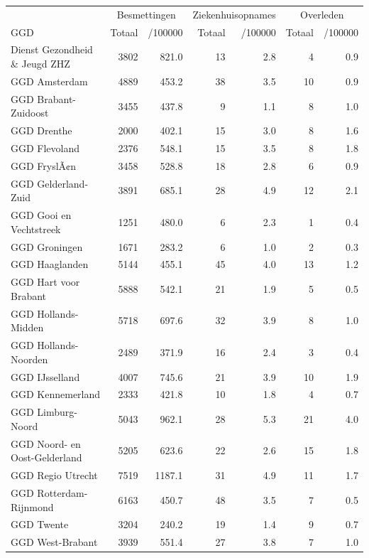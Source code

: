 \documentclass[
  english,
  man,floatsintext]{apa6}
\begin{document}
\begin{table}
\centering\begingroup\fontsize{10}{12}\selectfont

\begin{threeparttable}
\begin{tabular}{lrrrrrr}
\toprule
\multicolumn{1}{c}{ } & \multicolumn{2}{c}{Besmettingen} & \multicolumn{2}{c}{Ziekenhuisopnames} & \multicolumn{2}{c}{Overleden} \\
\cmidrule(l{3pt}r{3pt}){2-3} \cmidrule(l{3pt}r{3pt}){4-5} \cmidrule(l{3pt}r{3pt}){6-7}
GGD & Totaal & /100000 & Totaal & /100000 & Totaal & /100000\\
\midrule
Dienst Gezondheid \& Jeugd ZHZ & 3802 & 821.0 & 13 & 2.8 & 4 & 0.9\\
GGD Amsterdam & 4889 & 453.2 & 38 & 3.5 & 10 & 0.9\\
GGD Brabant-Zuidoost & 3455 & 437.8 & 9 & 1.1 & 8 & 1.0\\
GGD Drenthe & 2000 & 402.1 & 15 & 3.0 & 8 & 1.6\\
GGD Flevoland & 2376 & 548.1 & 15 & 3.5 & 8 & 1.8\\
GGD FryslÃ¢n & 3458 & 528.8 & 18 & 2.8 & 6 & 0.9\\
GGD Gelderland-Zuid & 3891 & 685.1 & 28 & 4.9 & 12 & 2.1\\
GGD Gooi en Vechtstreek & 1251 & 480.0 & 6 & 2.3 & 1 & 0.4\\
GGD Groningen & 1671 & 283.2 & 6 & 1.0 & 2 & 0.3\\
GGD Haaglanden & 5144 & 455.1 & 45 & 4.0 & 13 & 1.2\\
GGD Hart voor Brabant & 5888 & 542.1 & 21 & 1.9 & 5 & 0.5\\
GGD Hollands-Midden & 5718 & 697.6 & 32 & 3.9 & 8 & 1.0\\
GGD Hollands-Noorden & 2489 & 371.9 & 16 & 2.4 & 3 & 0.4\\
GGD IJsselland & 4007 & 745.6 & 21 & 3.9 & 10 & 1.9\\
GGD Kennemerland & 2333 & 421.8 & 10 & 1.8 & 4 & 0.7\\
GGD Limburg-Noord & 5043 & 962.1 & 28 & 5.3 & 21 & 4.0\\
GGD Noord- en Oost-Gelderland & 5205 & 623.6 & 22 & 2.6 & 15 & 1.8\\
GGD Regio Utrecht & 7519 & 1187.1 & 31 & 4.9 & 11 & 1.7\\
GGD Rotterdam-Rijnmond & 6163 & 450.7 & 48 & 3.5 & 7 & 0.5\\
GGD Twente & 3204 & 240.2 & 19 & 1.4 & 9 & 0.7\\
GGD West-Brabant & 3939 & 551.4 & 27 & 3.8 & 7 & 1.0\\

\end{tabular}
\end{threeparttable}
\end{table}
\end{document}

